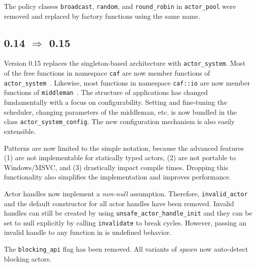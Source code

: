 The policy classes \lstinline^broadcast^, \lstinline^random^, and \lstinline^round_robin^ in \lstinline^actor_pool^ were removed and replaced by factory functions using the same name.

\clearpage
\subsection{0.14 $\Rightarrow$ 0.15}

Version 0.15 replaces the singleton-based architecture with \lstinline^actor_system^. Most of the free functions in namespace \lstinline^caf^ are now member functions of \lstinline^actor_system^~. Likewise, most functions in namespace \lstinline^caf::io^ are now member functions of \lstinline^middleman^~. The structure of \lib applications has changed fundamentally with a focus on configurability. Setting and fine-tuning the scheduler, changing parameters of the middleman, etc. is now bundled in the class \lstinline^actor_system_config^. The new configuration mechanism is also easily extensible.

Patterns are now limited to the simple notation, because the advanced features (1) are not implementable for statically typed actors, (2) are not portable to Windows/MSVC, and (3) drastically impact compile times. Dropping this functionality also simplifies the implementation and improves performance.

Actor handles now implement a \emph{non-null} assumption. Therefore, \lstinline^invalid_actor^ and the default constructor for all actor handles have been removed. Invalid handles can still be created by using \lstinline^unsafe_actor_handle_init^ and they can be set to null explicitly by calling \lstinline^invalidate^ to break cycles. However, passing an invalid handle to any function in \lib is undefined behavior.

The \lstinline^blocking_api^ flag has been removed. All variants of \emph{spawn} now auto-detect blocking actors.
